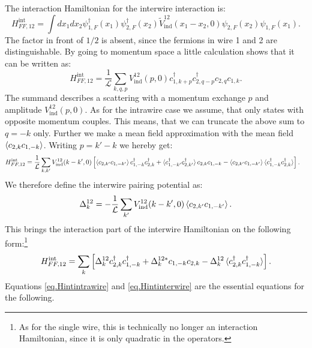 The interaction Hamiltonian for the interwire interaction is:
\begin{equation}
H^\text{int}_{FF,12} = \int dx_1 dx_2 \psi^\dagger_{1,F}(x_1)\psi^\dagger_{2,F}(x_2) \tilde{V}_{\text{ind}}^{12}(x_1-x_2,0) \psi_{2,F}(x_2)\psi_{1,F}(x_1).
\label{eq.Hint12realspace}
\end{equation}
The factor in front of $1/2$ is absent, since the fermions in wire 1 and 2 are distinguishable. By going to momentum space a little calculation shows that it can be written as:
\begin{equation}
H^\text{int}_{FF,12} = \frac{1}{\mathcal{L}}\sum_{k,q,p} V_{\text{ind}}^{12}(p,0) c^\dagger_{1,k + p} c^\dagger_{2, q - p} c_{2, q} c_{1, k}. 
\label{eq.Hint12momentumspace}
\end{equation}
The summand describes a scattering with a momentum exchange $p$ and amplitude $V_{\text{ind}}^{12}(p,0)$. As for the intrawire case we assume, that only states with opposite momentum couples. This means, that we can truncate the above sum to $q = -k$ only. Further we make a mean field approximation with the mean field $\braket{c_{2,k}c_{1,-k}}$. Writing $p = k' - k$ we hereby get:
\begin{align}
H^\text{int}_{FF,12} = \frac{1}{\mathcal{L}} \sum_{k,k'} V_{\text{ind}}^{12}(k-k',0) & \left[\braket{c_{2,k'}c_{1,-k'}}c^\dagger_{1,-k}c^\dagger_{2,k} + \braket{c^\dagger_{1,-k'}c^\dagger_{2,k'}}c_{2,k}c_{1,-k} - \braket{c_{2,k'}c_{1,-k'}}\braket{c^\dagger_{1,-k}c^\dagger_{2,k}} \right]. \nonumber
\end{align}
We therefore define the interwire pairing potential as:
\begin{equation}
\Delta^{12}_k = -\frac{1}{\mathcal{L}} \sum_{k'} V_{\text{ind}}^{12}(k-k',0)\braket{c_{2,k'}c_{1,-k'}}.
\end{equation}
This brings the interaction part of the interwire Hamiltonian on the following form:\footnote{As for the single wire, this is technically no longer an interaction Hamiltonian, since it is only quadratic in the operators.}
\begin{equation}
H^\text{int}_{FF,12} = \sum_{k} \left[\Delta^{12}_k c^\dagger_{2,k}c^\dagger_{1,-k} + \Delta^{12 *}_k c_{1,-k}c_{2,k} - \Delta^{12}_k\braket{c^\dagger_{2,k}c^\dagger_{1,-k}} \right].
\label{eq.Hintinterwire}
\end{equation}
Equations \ref{eq.Hintintrawire} and \ref{eq.Hintinterwire} are the essential equations for the following. 

